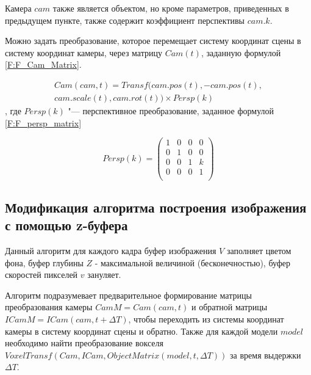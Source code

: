 Камера $cam$ также является объектом, но кроме параметров, приведенных в предыдущем пункте, также содержит коэффициент перспективы $cam.k$.

Можно задать преобразование, которое перемещает систему координат сцены в систему координат камеры, через матрицу $Cam(t)$, заданную формулой \eqref{F:F_Cam_Matrix}.

\begin{eqndesc}
    \begin{equation}
        \label{F:F_Cam_Matrix}
        \begin{matrix}
            {Cam(cam, t) = Transf(cam.pos(t), -cam.pos(t),} \\{ cam.scale(t), cam.rot(t)) \times Persp(k)}
        \end{matrix}
    \end{equation}
    , где
    $Persp(k)$ "--- перспективное преобразование, заданное формулой \eqref{F:F_persp_matrix}\\
\end{eqndesc}

\begin{equation}
    \label{F:F_persp_matrix}
    Persp(k) = \begin{pmatrix}
        1 & 0 & 0 & 0 \\
        0 & 1 & 0 & 0 \\
        0 & 0 & 1 & k \\
        0 & 0 & 0 & 1 \\
    \end{pmatrix}
\end{equation}

\subsection{Модификация алгоритма построения изображения с помощью z-буфера}


Данный алгоритм для каждого кадра буфер изображения $V$ заполняет цветом фона, буфер глубины $Z$ - максимальной величиной (бесконечностью), буфер скоростей пикселей $v$ зануляет. 

Алгоритм подразумевает предварительное формирование матрицы преобразования камеры $CamM = Cam(cam, t)$ и обратной матрицы $ICamM = ICam(cam, t + \Delta T)$, чтобы переходить из системы координат камеры в систему координат сцены и обратно. Также для каждой модели $model$ необходимо найти преобразование вокселя $VoxelTransf(Cam, ICam, ObjectMatrix(model, t, \Delta T))$ за время выдержки $\Delta T$.  

